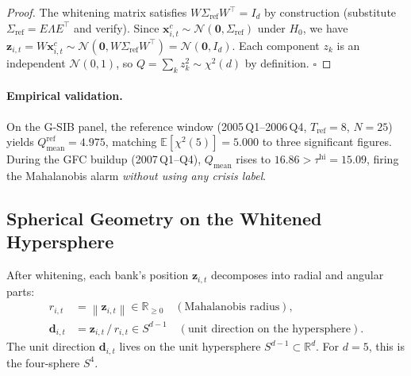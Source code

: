\documentclass[journal]{IEEEtran}
\newcommand{\R}{\mathbb{R}}
\newcommand{\E}{\mathbb{E}}
\newcommand{\norm}[1]{\left\lVert#1\right\rVert}
\begin{document}
\begin{proof}
The whitening matrix satisfies $W\Sigma_{\mathrm{ref}}W^\top=I_d$ by construction
(substitute $\Sigma_{\mathrm{ref}}=E\Lambda E^\top$ and verify).
Since $\mathbf{x}^c_{i,t} \sim \mathcal{N}(\mathbf{0},\Sigma_{\mathrm{ref}})$
under $H_0$, we have $\mathbf{z}_{i,t} = W\mathbf{x}^c_{i,t}
\sim \mathcal{N}(\mathbf{0},W\Sigma_{\mathrm{ref}}W^\top) = \mathcal{N}(\mathbf{0},I_d)$.
Each component $z_k$ is an independent $\mathcal{N}(0,1)$, so
$Q = \sum_k z_k^2 \sim \chi^2(d)$ by definition. $\square$
\end{proof}

\paragraph{Empirical validation.}
On the G-SIB panel, the reference window (2005\,Q1--2006\,Q4,
$T_{\mathrm{ref}}{=}8$, $N{=}25$) yields
$Q^{\mathrm{ref}}_{\mathrm{mean}} = 4.975$, matching $\E[\chi^2(5)]=5.000$
to three significant figures.  During the GFC buildup (2007\,Q1--Q4),
$Q_{\mathrm{mean}}$ rises to $16.86 > \tau^{\mathrm{hi}}=15.09$, firing the
Mahalanobis alarm \emph{without using any crisis label}.

\subsection{Spherical Geometry on the Whitened Hypersphere}
\label{ssec:sphere}

After whitening, each bank's position $\mathbf{z}_{i,t}$ decomposes into
radial and angular parts:
\begin{align}
  r_{i,t} &= \norm{\mathbf{z}_{i,t}} \in \R_{\ge 0} \quad (\text{Mahalanobis radius}),
  \label{eq:radius}\\
  \mathbf{d}_{i,t} &= \mathbf{z}_{i,t}\,/\,r_{i,t} \in S^{d-1}
  \quad (\text{unit direction on the hypersphere}).
  \label{eq:direction2}
\end{align}
The unit direction $\mathbf{d}_{i,t}$ lives on the unit hypersphere
$S^{d-1} \subset \R^d$.  For $d=5$, this is the four-sphere $S^4$.
\end{document}
